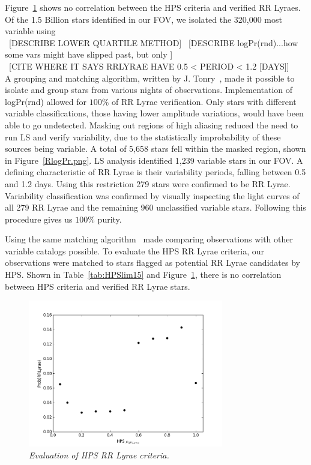 \documentclass[aps,prb,twocolumn,superscriptaddress]{revtex4-1}
\begin{document}
Figure~\ref{fig:probrrHPS} shows no correlation between the HPS criteria and verified RR Lyraes.  Of the 1.5 Billion stars identified in our FOV, we isolated the 320,000 most variable using\\
~[DESCRIBE LOWER QUARTILE METHOD]
~[DESCRIBE logPr(rnd)...how some vars might have slipped past, but only ]\\
~[CITE WHERE IT SAYS RRLYRAE HAVE 0.5 < PERIOD < 1.2 [DAYS]]\\
A grouping and matching algorithm, written by J. Tonry~\cite{gri}, made it possible to isolate and group 
stars from various nights of observations.  
Implementation of logPr(rnd) allowed for $100\%$ of RR Lyrae verification.  Only stars with different 
variable classifications, those having lower amplitude variations, would have been able to go
undetected.  Masking out regions of high aliasing reduced the need to run LS and verify variability, 
due to the statistically improbability of these sources being variable.  A total of 5,658 stars fell within 
the masked region, shown in Figure~\ref{RlogPr.png}.  LS analysis identified 1,239 variable stars in our FOV.  
A defining characteristic of RR Lyrae is their variability periods, falling between 0.5 and 1.2 days.  Using this 
restriction 279 stars were confirmed to be RR Lyrae.  Variability classification was confirmed by visually inspecting 
the light curves of all 279 RR Lyrae and the remaining 960 unclassified variable stars.  Following this procedure gives us 
$100\%$ purity.

Using the same matching algorithm~\cite{gri} made comparing observations with other variable catalogs possible.  
To evaluate the HPS RR Lyrae criteria, our observations were matched to stars flagged as potential RR Lyrae candidates by HPS.  
Shown in Table~\ref{tab:HPSlim15} and Figure~\ref{fig:probrrHPS}, there is no correlation between HPS criteria and 
verified RR Lyrae stars.


\begin{figure}[H]
 \centering
 	\includegraphics[width=3.35in]{figures/probrr_vs_HPS.png}
 \caption{\it \small{Evaluation of HPS RR Lyrae criteria.}}
 \label{fig:probrrHPS}
\end{figure}
\end{document}
